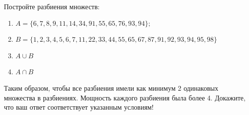 \question
Постройте разбиения множеств:
\begin{enumerate}
	\renewcommand{\labelenumi}{\alph{enumi})}
	\item $A = \{6, 7, 8, 9, 11, 14, 34, 91, 55, 65, 76, 93, 94\};$
	\item $B = \{1, 2, 3, 4, 5, 6, 7, 11, 22, 33, 44, 55, 65, 67, 87, 91, 92, 93, 94, 95, 98\}$
	\item $A \cup B$
	\item $A \cap B$
\end{enumerate}
Таким образом, чтобы все разбиения имели как минимум 2 одинаковых множества в разбиениях.
Мощность каждого разбиения была более 4.
Докажите, что ваш ответ соответствует указанным условиям!
